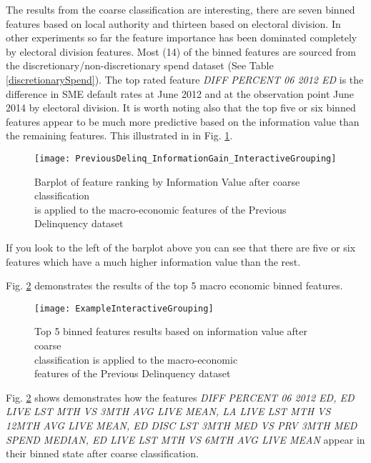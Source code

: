 The results from the coarse classification are interesting, there are seven binned features based on local authority and thirteen based on electoral division. In other experiments so far the feature importance has been dominated completely by electoral division features. Most (14) of the binned features are sourced from the discretionary/non-discretionary spend dataset  (See Table \ref{discretionarySpend}). The top rated feature \textit{DIFF PERCENT 06 2012 ED} is the difference in SME default rates at June 2012 and at the observation point June 2014 by electoral division. It is worth noting also that the top five or six binned features appear to be much more predictive based on the information value than the remaining features. This illustrated in in Fig. \ref{fig:Information Value using SAS Previous Delinquency Features}.

\begin{figure}[H]
	\texttt{[image: PreviousDelinq\_InformationGain\_InteractiveGrouping]}
	\caption{Barplot of feature ranking by Information Value after coarse classification \\is applied to the macro-economic features of the Previous Delinquency dataset}
	\label{fig:Information Value using SAS Previous Delinquency Features}
\end{figure}

If you look to the left of the barplot above you can see that there are five or six features which have a much higher information value than the rest.


Fig. \ref{fig:Interactive Grouping Diff Percent 06 2012 ED} demonstrates the results of the top 5 macro economic binned features.
\begin{figure}[H]
	\texttt{[image: ExampleInteractiveGrouping]}
	\caption{Top 5 binned features results based on information value after coarse \\classification is applied to the macro-economic\\ features of the Previous Delinquency dataset}
	\label{fig:Interactive Grouping Diff Percent 06 2012 ED}
\end{figure}

Fig. \ref{fig:Interactive Grouping Diff Percent 06 2012 ED} shows demonstrates how the features  \textit{DIFF PERCENT 06 2012 ED, ED LIVE LST MTH VS 3MTH AVG LIVE MEAN, LA LIVE LST MTH VS 12MTH AVG LIVE MEAN, ED DISC LST 3MTH MED VS PRV 3MTH MED SPEND MEDIAN, ED LIVE LST MTH VS 6MTH AVG LIVE MEAN} appear in their binned state after coarse classification. 

